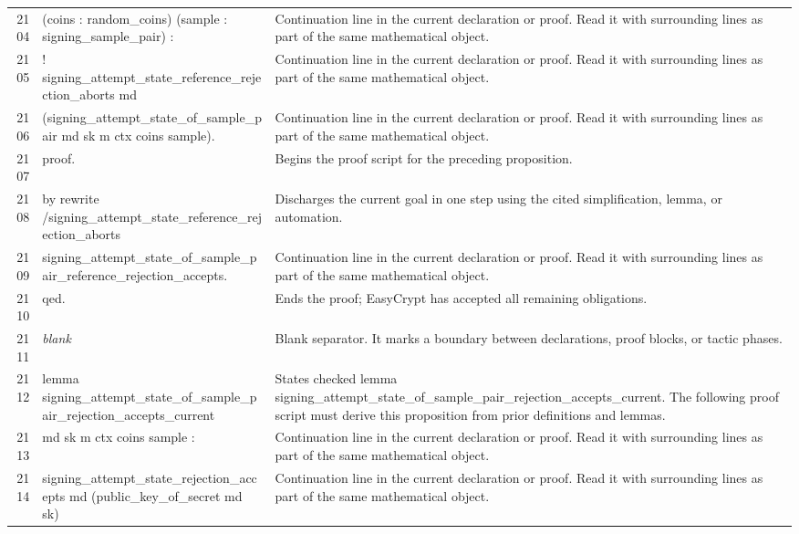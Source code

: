 \documentclass[10pt]{article}
\begin{document}
\begin{longtable}{r L{0.53\textwidth} L{0.37\textwidth}}
2104 & {\ttfamily\scriptsize    (coins : random\_coins) (sample : signing\_sample\_pair) :} & Continuation line in the current declaration or proof.  Read it with surrounding lines as part of the same mathematical object. \\
2105 & {\ttfamily\scriptsize   ! signing\_attempt\_state\_reference\_rejection\_aborts md} & Continuation line in the current declaration or proof.  Read it with surrounding lines as part of the same mathematical object. \\
2106 & {\ttfamily\scriptsize       (signing\_attempt\_state\_of\_sample\_pair md sk m ctx coins sample).} & Continuation line in the current declaration or proof.  Read it with surrounding lines as part of the same mathematical object. \\
2107 & {\ttfamily\scriptsize proof.} & Begins the proof script for the preceding proposition. \\
2108 & {\ttfamily\scriptsize by rewrite /signing\_attempt\_state\_reference\_rejection\_aborts} & Discharges the current goal in one step using the cited simplification, lemma, or automation. \\
2109 & {\ttfamily\scriptsize            signing\_attempt\_state\_of\_sample\_pair\_reference\_rejection\_accepts.} & Continuation line in the current declaration or proof.  Read it with surrounding lines as part of the same mathematical object. \\
2110 & {\ttfamily\scriptsize qed.} & Ends the proof; EasyCrypt has accepted all remaining obligations. \\
2111 & {\ttfamily\scriptsize \emph{blank}} & Blank separator.  It marks a boundary between declarations, proof blocks, or tactic phases. \\
2112 & {\ttfamily\scriptsize lemma signing\_attempt\_state\_of\_sample\_pair\_rejection\_accepts\_current} & States checked lemma signing\_attempt\_state\_of\_sample\_pair\_rejection\_accepts\_current.  The following proof script must derive this proposition from prior definitions and lemmas. \\
2113 & {\ttfamily\scriptsize    md sk m ctx coins sample :} & Continuation line in the current declaration or proof.  Read it with surrounding lines as part of the same mathematical object. \\
2114 & {\ttfamily\scriptsize   signing\_attempt\_state\_rejection\_accepts md (public\_key\_of\_secret md sk)} & Continuation line in the current declaration or proof.  Read it with surrounding lines as part of the same mathematical object. \\

\end{longtable}
\end{document}
